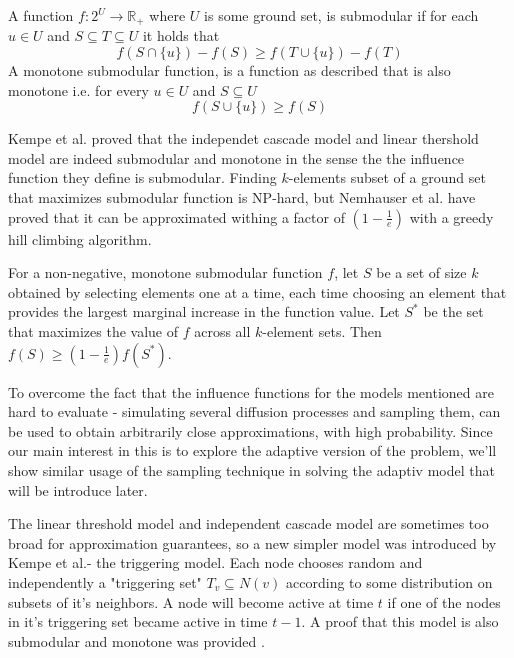 \begin{definition}
A function $f:2^U\rightarrow \mathbb{R}_+$ where $U$ is some ground set, is submodular if for each $u\in U$ and $S\subseteq T\subseteq U$ it holds that $$f(S\cap\{u\})-f(S)\ge f(T\cup\{u\})-f(T)$$ A monotone submodular function, is a function as described that is also monotone i.e. for every $u\in U$ and $S\subseteq U$ $$f(S\cup\{u\})\ge f(S)$$
\end{definition}

Kempe et al. proved that the independet cascade model and linear thershold model are indeed submodular and monotone in the sense the the influence function they define is submodular. Finding $k$-elements subset of a ground set that maximizes submodular function is NP-hard, but Nemhauser et al.  have proved that it can be approximated withing a factor of $(1-\frac{1}{e})$ \cite{nemhauser1978analysis} with a greedy hill climbing algorithm. 

\begin{theorem} \label{thm:nemhauser}
\cite{nemhauser1978analysis} For a non-negative, monotone submodular function $f$, let $S$ be a set of size $k$ obtained by selecting elements one at a time, each time choosing an element that provides the largest marginal increase in the function value. Let $S^*$ be the set that maximizes the value of $f$ across all $k$-element sets. Then $f(S)\ge(1-\frac{1}{e})f(S^*)$. 
\end{theorem}

To overcome the fact that the influence functions for the models mentioned are hard to evaluate - simulating several diffusion processes and sampling them, can be used to obtain arbitrarily close approximations, with high probability. Since our main interest in this is to explore the adaptive version of the problem, we'll show similar usage of the sampling technique in solving the adaptiv model that will be introduce later.

\begin{definition}
The linear threshold model and independent cascade model are sometimes too broad for approximation guarantees, so a new simpler model was introduced by Kempe et al.- the triggering model. Each node chooses random and independently a "triggering set" $T_v\subseteq N(v)$ according to some distribution on subsets of it's neighbors. A node will become active at time $t$ if one of the nodes in it's triggering set became active in time $t-1$. A proof that this model is also submodular and monotone was provided \cite{kempe2003maximizing}.
\end{definition}


